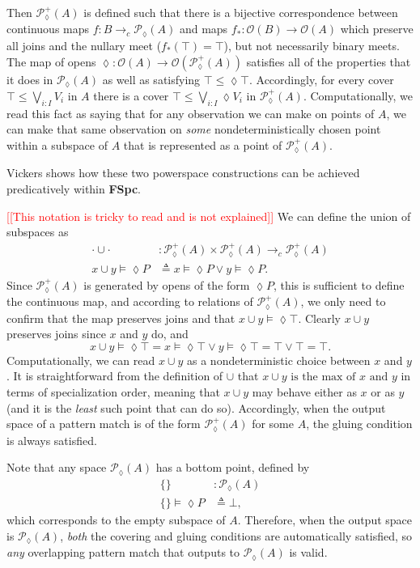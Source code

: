 \documentclass[conference]{IEEEtran}
\newcommand{\PLower}{\mathcal{P}_\lozenge}
\newcommand{\cto}{\to_c}
\newcommand{\Open}[1]{\mathcal{O}({#1})}
\newcommand{\note}[1]{\textcolor{red}{[[{#1}]]}}
\newcommand{\isthemaxof}[3]{{#1}\text{ is the max of }{#2}\text{ and }{#3}}
\begin{document}
Then $\PLower^+(A)$ is defined such that there is a bijective correspondence between continuous maps $f : B \cto \PLower(A)$ and maps $f_* : \Open{B} \to \Open{A}$ which preserve all joins and the nullary meet ($f_*(\top) = \top$), but not necessarily binary meets. The map of opens $\lozenge : \Open{A} \to \Open{\PLower^+(A)}$ satisfies all of the properties that it does in $\PLower(A)$ as well as satisfying
$\top \le \lozenge \top$. Accordingly, for every cover $\top \le \bigvee_{i : I} V_i$ in $A$ there is a cover $\top \le \bigvee_{i : I} \lozenge V_i$ in $\PLower^+(A)$. Computationally, we read this fact as saying that for any observation we can make on points of $A$, we can make that same observation on \emph{some} nondeterministically chosen point within a subspace of $A$ that is represented as a point of $\PLower^+(A)$.

Vickers \cite{vickersdoublepowerlocale} shows how these two powerspace constructions can be achieved predicatively within \textbf{FSpc}. 

\note{This notation is tricky to read and is not explained} We can define the union of subspaces as
\begin{align*}
\cdot \cup \cdot &: \PLower^+(A) \times \PLower^+(A) \cto \PLower^+(A)
\\ x \cup y \models \lozenge P &\triangleq x \models \lozenge P \vee y \models \lozenge P.
\end{align*}
Since $\PLower^+(A)$ is generated by opens of the form $\lozenge P$, this is sufficient to define the continuous map, and according to relations of $\PLower^+(A)$, we only need to confirm that the map preserves joins and that $x \cup y \models \lozenge \top$. Clearly $x \cup y$ preserves joins since $x$ and $y$ do, and 
\[
x \cup y \models \lozenge \top = x \models \lozenge \top \vee y \models \lozenge \top = \top \vee \top = \top.
\]
Computationally, we can read $x \cup y$ as a nondeterministic choice between $x$ and $y$.
It is straightforward from the definition of $\cup$ that $\isthemaxof{x \cup y}{x}{y}$ in terms of specialization order, meaning that $x \cup y$ may behave either as $x$ or as $y$ (and it is the \emph{least} such point that can do so). Accordingly, when the output space of a pattern match is of the form $\PLower^+(A)$ for some $A$, the gluing condition is always satisfied.

Note that any space $\PLower(A)$ has a bottom point, defined by
\begin{align*}
\{ \} &: \PLower(A)
\\ \{ \} \models \lozenge P &\triangleq \bot,
\end{align*}
which corresponds to the empty subspace of $A$. Therefore, when the output space is $\PLower(A)$, \emph{both} the covering and gluing conditions are automatically satisfied, so \emph{any} overlapping pattern match that outputs to $\PLower(A)$ is valid.
\end{document}
